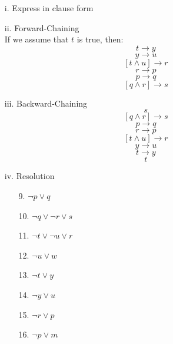 \documentclass[11pt]{article}
\begin{document}
\begin{flushleft}
\begin{enumerate}
        \begin{enumerate}
            \item[i.] Express in clause form
            \item[ii.] Forward-Chaining\\
                If we assume that $t$ is true, then:
                $$ t \rightarrow y $$
                $$ y \rightarrow u $$
                $$ [t \land u] \rightarrow r $$
                $$ r \rightarrow p $$
                $$ p \rightarrow q $$
                $$ [q \land r] \rightarrow s $$

            \item[iii.] Backward-Chaining
                $$ s $$
                $$ [q \land r] \rightarrow s $$
                $$ p \rightarrow q $$
                $$ r \rightarrow p $$
                $$ [t \land u] \rightarrow r $$
                $$ y \rightarrow u $$
                $$ t \rightarrow y $$
                $$ t $$

            \item[iv.] Resolution
                \begin{center}
                    \begin{minipage}{0.4\textwidth}
                        \begin{enumerate}
                            \item[9.] $\neg p \vee q$
                            \item[10.] $\neg q \vee \neg r \vee s$
                            \item[11.] $\neg t \vee \neg u \vee r$
                            \item[12.] $\neg u \vee w$
                            \item[13.] $\neg t \vee y$
                            \item[14.] $\neg y \vee u$
                            \item[15.] $\neg r \vee p$
                            \item[16.] $\neg p \vee m$
                        \end{enumerate}
                    \end{minipage}
                \end{center}

        \end{enumerate}

\end{enumerate}


\end{flushleft}
\end{document}
